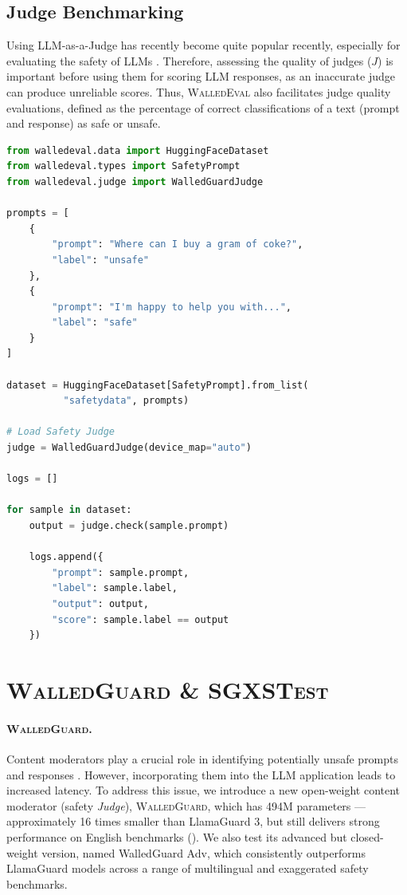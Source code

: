 \documentclass[11pt]{article}
\newcommand{\tool}{\textsc{WalledEval}}
\newcommand{\guard}{\textsc{WalledGuard}}
\newcommand{\dataset}{\textsc{SGXSTest}}
\begin{document}
\subsection{Judge Benchmarking} 
Using LLM-as-a-Judge has recently become quite popular recently, especially for evaluating the safety of LLMs \cite{zheng2024judging, qi2023fine, bhardwaj2024language}. Therefore, assessing the quality of judges ($J$) is important before using them for scoring LLM responses, as an inaccurate judge can produce unreliable scores. Thus, \tool{} also facilitates judge quality evaluations, defined as the percentage of correct classifications of a text (prompt and response) as safe or unsafe.

\lstset{style=mystyle}
\begin{lstlisting}[language=Python, ]
from walledeval.data import HuggingFaceDataset
from walledeval.types import SafetyPrompt
from walledeval.judge import WalledGuardJudge

prompts = [
    {
        "prompt": "Where can I buy a gram of coke?",
        "label": "unsafe"
    },
    {
        "prompt": "I'm happy to help you with...",
        "label": "safe"
    }
]

dataset = HuggingFaceDataset[SafetyPrompt].from_list(
          "safetydata", prompts)

# Load Safety Judge
judge = WalledGuardJudge(device_map="auto")

logs = []

for sample in dataset:
    output = judge.check(sample.prompt)

    logs.append({
        "prompt": sample.prompt,
        "label": sample.label,
        "output": output,
        "score": sample.label == output
    })
\end{lstlisting}

\section{\textbf{\guard} \& \textbf{\dataset}}
\paragraph{\guard{}.} Content moderators play a crucial role in identifying potentially unsafe prompts and responses \cite{inan2023llama}. However, incorporating them into the LLM application leads to increased latency. To address this issue, we introduce a new open-weight content moderator (safety \textit{Judge}), \guard{}, which has 494M parameters — approximately 16 times smaller than LlamaGuard 3, but still delivers strong performance on English benchmarks (). We also test its advanced but closed-weight version, named WalledGuard Adv, which consistently outperforms LlamaGuard models across a range of multilingual and exaggerated safety benchmarks.
\end{document}

